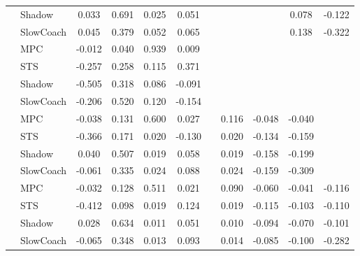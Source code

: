 \begin{tabular}{|l|l|*{9}{c|}}
                                                           & Shadow &    0.033 &     0.691 &     0.025 &  0.051 &     &     &      &   0.078 &   -0.122 \\
                                                           & SlowCoach &    0.045 &     0.379 &     0.052 &  0.065 &     &     &      &   0.138 &   -0.322 \\
\midrule
[True, True, True, True, False, False, False, False, False] & MPC &   -0.012 &     0.040 &     0.939 &  0.009 &     &     &      &      &       \\
                                                           & STS &   -0.257 &     0.258 &     0.115 &  0.371 &     &     &      &      &       \\
                                                           & Shadow &   -0.505 &     0.318 &     0.086 & -0.091 &     &     &      &      &       \\
                                                           & SlowCoach &   -0.206 &     0.520 &     0.120 & -0.154 &     &     &      &      &       \\
\midrule
[True, True, True, True, False, True, True, True, False] & MPC &   -0.038 &     0.131 &     0.600 &  0.027 &     &  0.116 &  -0.048 &  -0.040 &       \\
                                                           & STS &   -0.366 &     0.171 &     0.020 & -0.130 &     &  0.020 &  -0.134 &  -0.159 &       \\
                                                           & Shadow &    0.040 &     0.507 &     0.019 &  0.058 &     &  0.019 &  -0.158 &  -0.199 &       \\
                                                           & SlowCoach &   -0.061 &     0.335 &     0.024 &  0.088 &     &  0.024 &  -0.159 &  -0.309 &       \\
\midrule
[True, True, True, True, False, True, True, True, True] & MPC &   -0.032 &     0.128 &     0.511 &  0.021 &     &  0.090 &  -0.060 &  -0.041 &   -0.116 \\
                                                           & STS &   -0.412 &     0.098 &     0.019 &  0.124 &     &  0.019 &  -0.115 &  -0.103 &   -0.110 \\
                                                           & Shadow &    0.028 &     0.634 &     0.011 &  0.051 &     &  0.010 &  -0.094 &  -0.070 &   -0.101 \\
                                                           & SlowCoach &   -0.065 &     0.348 &     0.013 &  0.093 &     &  0.014 &  -0.085 &  -0.100 &   -0.282 \\

\end{tabular}
